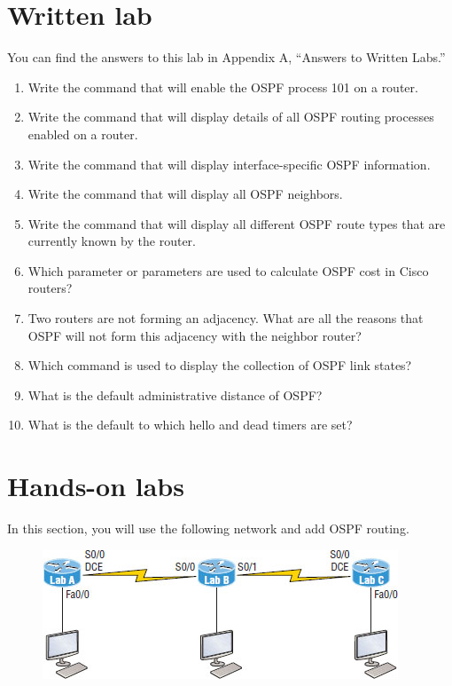 \section{Written lab}

You can find the answers to this lab in Appendix A, ``Answers to Written
Labs.''

\begin{enumerate}
\item
  Write the command that will enable the OSPF process 101 on a router.
\item
  Write the command that will display details of all OSPF routing
  processes enabled on a router.
\item
  Write the command that will display interface-specific OSPF
  information.
\item
  Write the command that will display all OSPF neighbors.
\item
  Write the command that will display all different OSPF route types
  that are currently known by the router.
\item
  Which parameter or parameters are used to calculate OSPF cost in Cisco
  routers?
\item
  Two routers are not forming an adjacency. What are all the reasons
  that OSPF will not form this adjacency with the neighbor router?
\item
  Which command is used to display the collection of OSPF link states?
\item
  What is the default administrative distance of OSPF?
\item
  What is the default to which hello and dead timers are set?
\end{enumerate}



\section{Hands-on labs}

In this section, you will use the following network and add OSPF
routing.

\begin{figure}
\centering
   \includegraphics{images/c18f007.jpg}
\caption{}
\end{figure}

